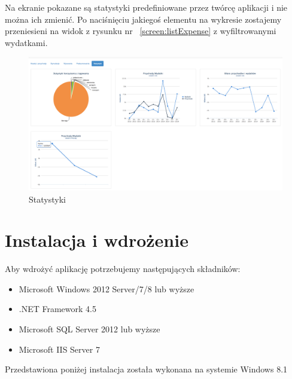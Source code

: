 \documentclass[10pt,titlepage]{article}
\begin{document}
Na ekranie pokazane są statystyki predefiniowane przez twórcę aplikacji i nie można ich zmienić. Po naciśnięciu jakiegoś elementu na wykresie zostajemy przeniesieni na widok z rysunku nr ~\ref{screen:listExpense} z wyfiltrowanymi wydatkami.
\begin{figure}[H]
  \centering
  \includegraphics[scale=0.2]{images/screen_statystyki.png}
  \caption{Statystyki}
\end{figure}
\section{Instalacja i wdrożenie}
Aby wdrożyć aplikację potrzebujemy następujących składników:
\begin{itemize}
  \item Microsoft Windows 2012 Server/7/8 lub wyższe
  \item .NET Framework 4.5
  \item Microsoft SQL Server 2012 lub wyższe
  \item Microsoft IIS Server 7
\end{itemize}
Przedstawiona poniżej instalacja została wykonana na systemie Windows 8.1
\end{document}
